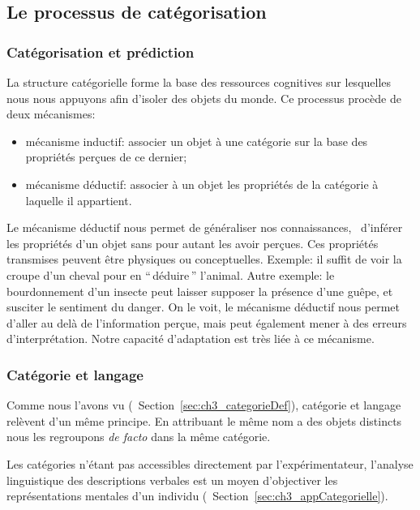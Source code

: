\subsection{Le processus de catégorisation}
\label{sec:ch3_categoProcess}

\subsubsection{Catégorisation et prédiction}
\label{sec:ch3_categoPred}

La structure catégorielle forme la base des ressources cognitives sur lesquelles nous nous appuyons afin d'isoler des objets du monde. Ce processus procède de deux mécanismes:

\begin{itemize} 
\item mécanisme inductif: associer un objet à une catégorie sur la base des propriétés perçues de ce dernier;
\item mécanisme déductif: associer à un objet les propriétés de la catégorie à laquelle il appartient.
\end{itemize}

Le mécanisme déductif nous permet de généraliser nos connaissances, \ie~d'inférer les propriétés d'un objet sans pour autant les avoir perçues. Ces propriétés transmises peuvent être physiques ou conceptuelles. Exemple: il suffit de voir la croupe d'un cheval pour en ``\,déduire\,'' l'animal. Autre exemple: le bourdonnement d'un insecte peut laisser supposer la présence d'une guêpe, et susciter le sentiment du danger. On le voit, le mécanisme déductif nous permet d'aller au delà de l'information perçue, mais peut également mener à des erreurs d'interprétation. Notre capacité d’adaptation est très liée à ce mécanisme.

\subsubsection{Catégorie et langage}
\label{sec:ch3_catLang}

Comme nous l'avons vu (\cf~Section~\ref{sec:ch3_categorieDef}), catégorie et langage relèvent d'un même principe. En attribuant le même nom a des objets distincts nous les regroupons \emph{de facto} dans la même catégorie.

Les catégories n'étant pas accessibles directement par l'expérimentateur, l'analyse linguistique des descriptions verbales est un moyen d'objectiver les représentations mentales d'un individu (\cf~Section~\ref{sec:ch3_appCategorielle}).

